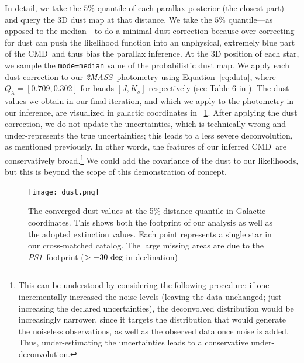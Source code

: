 \documentclass[modern]{aastex61}
\newcommand{\acronym}[1]{{\small{#1}}}
\newcommand{\project}[1]{\textsl{#1}}
\newcommand{\tmass}{\project{\acronym{2MASS}}}
\newcommand{\psone}{\project{\acronym{PS1}}}
\newcommand{\cmd}{\acronym{CMD}}
\begin{document}
In detail, we take the $5\%$
quantile of each parallax posterior (the closest part) and query the 3D dust map at that distance.
We take the $5\%$ quantile---as apposed to the median---to do a minimal dust
correction because over-correcting for dust can push the likelihood
function into an unphysical, extremely blue part of the \cmd\ and thus bias the
parallax inference. At the 3D position of each star, we sample the \texttt{mode=median} value of the probabilistic dust map.
We apply each dust correction to our
\tmass\ photometry using Equation~\ref{eq:data}, where $Q_{\lambda}
= [0.709, 0.302]$ for bands $[J, K_s]$ respectively (see Table 6 in
\citealt{schlafly11}).
The dust values we obtain in our final
iteration, and which we apply to the photometry in our inference, are visualized in
galactic coordinates in \figurename~\ref{fig:dust}.
After applying the dust correction, we do not update the uncertainties, which is
technically wrong and under-represents the true uncertainties; this leads to a less severe deconvolution, as mentioned previously.
In other words, the features of our inferred
  \cmd\ are conservatively broad.\footnote{This can be understood by considering the following procedure: if one incrementally increased the noise levels (leaving the data unchanged; just increasing the declared uncertainties), the deconvolved distribution would be increasingly narrower, since it targets the distribution that would generate the noiseless observations, as well as the observed data once noise is added. Thus, under-estimating the uncertainties leads to a conservative under-deconvolution.}
We could add the covariance of
the dust to our likelihoods, but this is beyond the scope of this
demonstration of concept.
\begin{figure}
\centering
  \texttt{[image: dust.png]}
\caption{The converged dust values at the 5\% distance quantile in Galactic coordinates. This shows both the footprint of our analysis as well as the adopted extinction values. Each point represents a single star in our cross-matched catalog. The large missing areas are due to the \psone\ footprint ($>-30~{\rm deg}$ in declination)}
\label{fig:dust}
\end{figure}
\end{document}
